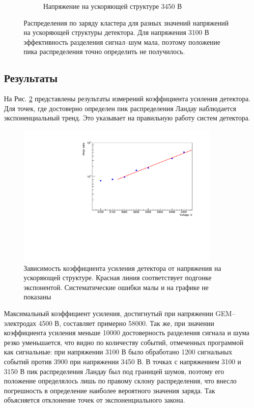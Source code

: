 \begin{figure}[h]
\begin{subfigure}{.45\textwidth}
	\caption{Напряжение на ускоряющей структуре 3450 В}
\end{subfigure}
\caption{Распределения по заряду кластера для разных значений напряжений на ускоряющей структуры детектора. Для напряжения 3100 В эффективность разделения сигнал--шум мала, поэтому положение пика распределения точно определить не получилось.}
\label{fig:charge_landau}
\end{figure}

\subsection{Результаты}
На Рис. \ref{fig:ampl_graph} представлены результаты измерений коэффициента усиления детектора. Для точек, где достоверно определен пик распределения Ландау наблюдается экспоненциальный тренд. Это указывает на правильную работу систем детектора.
\begin{figure}[h]
	\centering
	\includegraphics[width = 10cm]{img/Ampl_gr_log.pdf}
	\caption{Зависимость коэффициента усиления детектора от напряжения на ускоряющей структуре. Красная линия соответствует подгонке экспонентой. Систематические ошибки малы и на графике не показаны}
	\label{fig:ampl_graph}
\end{figure}
Максимальный коэффициент усиления, достигнутый при напряжении GEM--электродах 4500 В, составляет примерно 58000. Так же, при значении коэффициента усиления меньше 10000 достоверность разделения сигнала и шума резко уменьшается, что видно по количеству событий, отмеченных программой как сигнальные: при напряжении 3100 В было обработано 1200 сигнальных событий против 3900 при напряжении 3450 В. В точках с напряжением 3100 и 3150 В пик распределения Ландау был под границей шумов, поэтому его положение определялось лишь по правому склону распределения, что внесло погрешность в определение наиболее вероятного значения заряда. Так объясняется отклонение точек от экспоненциального закона. 

